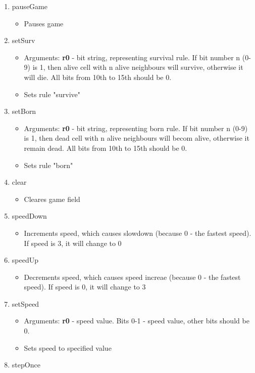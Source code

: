 \begin{enumerate}
	\item pauseGame
		\begin{itemize}
			\item Pauses game
		\end{itemize}
	\item setSurv
		\begin{itemize}
			\item Arguments: \textbf{r0} - bit string, representing survival rule. If bit number n (0-9) is 1, then alive cell with n alive neighbours will survive, otherwise it will die. All bits from 10th to 15th should be 0.
			\item Sets rule "survive"
		\end{itemize}
	\item setBorn
		\begin{itemize}
			\item Arguments: \textbf{r0} - bit string, representing born rule. If bit number n (0-9) is 1, then dead cell with n alive neighbours will becom alive, otherwise it remain dead. All bits from 10th to 15th should be 0.
			\item Sets rule "born"
		\end{itemize}
	\item clear
		\begin{itemize}
			\item Cleares game field
		\end{itemize}
	\item speedDown
		\begin{itemize}
			\item Increments speed, which causes slowdown (because 0 - the fastest speed). If speed is 3, it will change to 0
		\end{itemize}
	\item speedUp
		\begin{itemize}
			\item Decrements speed, which causes speed increae (because 0 - the fastest speed). If speed is 0, it will change to 3
		\end{itemize}
	\item setSpeed
		\begin{itemize}
			\item Arguments: \textbf{r0} - speed value. Bits 0-1 - speed value, other bits should be 0.
			\item Sets speed to specified value
		\end{itemize}
	\item stepOnce
		\begin{itemize}

\end{itemize}
\end{enumerate}
